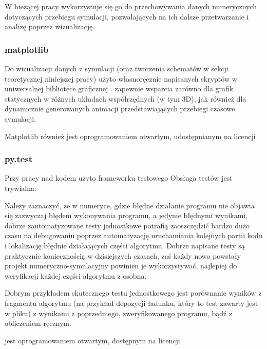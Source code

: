     W bieżącej pracy wykorzystuje się go do przechowywania danych numerycznych dotyczących
    przebiegu symulacji, pozwalających na ich dalsze przetwarzanie i analizę poprzez
    wizualizację.

    \subsubsection{matplotlib}
    Do wizualizacji danych z symulacji
    (oraz tworzenia schematów w sekcji teoretycznej niniejszej pracy)
    użyto własnoręcznie napisanych skryptów w uniwersalnej bibliotece graficznej
    .  zapewnie wsparcia zarówno
    dla grafik statycznych w różnych układach współrzędnych (w tym 3D), jak również dla
    dynamicznie generowanych animacji przedstawiających przebiegi czasowe symulacji.

    Matplotlib również jest oprogramowaniem otwartym, udostępnianym na licencji

    \subsubsection{py.test}
    Przy pracy nad kodem użyto frameworku testowego  
    Obsługa testów jest trywialna:


    Należy zaznaczyć, że w numeryce, gdzie błędne działanie programu nie objawia się
    zazwyczaj błędem wykonywania programu, a jedynie błędnymi wynikami, dobrze zautomatyzowane
    testy jednostkowe potrafią zaoszczędzić bardzo dużo czasu na debugowaniu
    poprzez automatyzację uruchamiania kolejnych partii kodu i lokalizację błędnie działających
    części algorytmu. Dobrze napisane testy są praktycznie koniecznością w dzisiejszych
    czasach, zaś każdy nowo powstały projekt numeryczno-symulacyjny powinien je
    wykorzystywać, najlepiej do weryfikacji każdej części algorytmu z osobna.

    Dobrym przykładem skutecznego testu jednostkowego jest porównanie wyników z fragmentu
    algorytmu (na przykład depozycji ładunku, który to test zawarty jest w pliku)
     
    z wynikami z poprzedniego, zweryfikowanego programu, bądź z obliczeniem ręcznym.

     jest oprogramowaniem otwartym, dostępnym na licencji 

